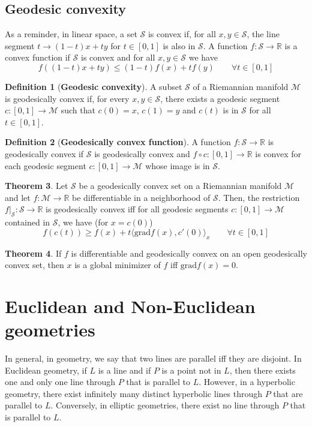 \documentclass[12pt, openany]{report}
\newcommand{\R}{\mathbb{R}}
\newcommand{\M}{\mathcal{M}}
\theoremstyle{definition}
\newtheorem{thm}{Theorem}[chapter]
\newtheorem{definition}[thm]{Definition}
\begin{document}
\subsection{Geodesic convexity}
As a reminder, in linear space, a set $\mathcal{S}$ is convex if, for all $x,y\in \mathcal{S}$, the line segment $t\to (1-t)x+ty$ for $t\in [0,1]$ is also in $\mathcal{S}$. A function $f:\mathcal{S}\to \R$ is a convex function if $\mathcal{S}$ is convex and for all $x,y\in \mathcal{S}$ we have 
\begin{equation}
	f((1-t)x+ty)\le (1-t)f(x)+tf(y)\qquad \forall t\in [0,1]
\end{equation}
\begin{definition}[\textbf{Geodesic convexity}]
	A subset $\mathcal{S}$ of a Riemannian manifold $\M$ is geodesically convex if, for every $x,y\in \mathcal{S}$, there exists a geodesic segment $c:[0,1]\to \M$ such that $c(0)=x$, $c(1)=y$ and $c(t)$ is in $\mathcal{S}$ for all $t\in [0,1]$. 
\end{definition}
\begin{definition}[\textbf{Geodesically convex function}]
	A function $f:\mathcal{S}\to \R$ is geodesically convex if $\mathcal{S}$ is geodesically convex and $f\circ c:[0,1]\to \R$ is convex for each geodesic segment $c:[0,1]\to \M$ whose image is in $\mathcal{S}$. 
\end{definition}
\begin{thm}
	Let $\mathcal{S}$ be a geodesically convex set on a Riemannian manifold $\M$ and let $f:\M\to \R$ be differentiable in a neighborhood of $\mathcal{S}$. Then, the restriction $f|_\mathcal{S}:\mathcal{S}\to \R$ is geodesically convex iff for all geodesic segments $c:[0,1]\to \M$ contained in $\mathcal{S}$, we have (for $x=c(0)$)
	\begin{equation}
		f(c(t)) \ge f(x) + t \langle \text{grad}f(x), c'(0)\rangle_x \qquad \forall t\in [0,1]
	\end{equation}
\end{thm}
\begin{thm}
	If $f$ is differentiable and geodesically convex on an open geodesically convex set, then $x$ is a global minimizer of $f$ iff $\text{grad}f(x)=0$. 
\end{thm}
\section{Euclidean and Non-Euclidean geometries}
In general, in geometry, we say that two lines are parallel iff they are disjoint. In Euclidean geometry, if $L$ is a line and if $P$ is a point not in $L$, then there exists one and only one line through $P$ that is parallel to $L$. However, in a hyperbolic geometry, there exist infinitely many distinct hyperbolic lines through $P$ that are parallel to $L$. Conversely, in elliptic geometries, there exist no line through $P$ that is parallel to $L$. \\
\end{document}
